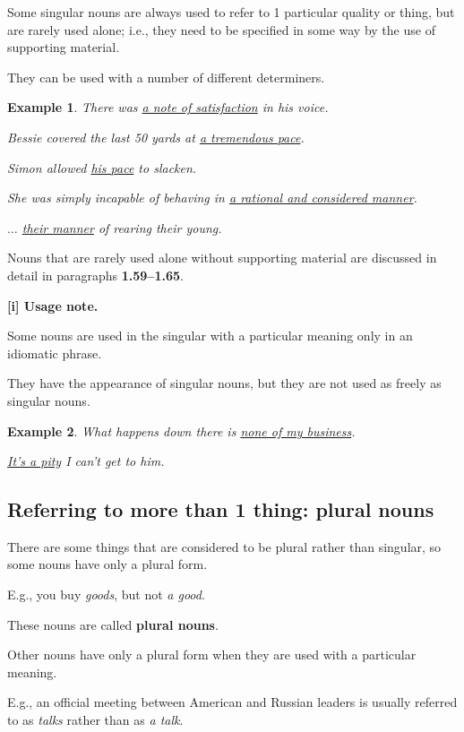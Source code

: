 \documentclass[oneside]{book}
\numberwithin{equation}{section}
\newtheorem{example}{Example}[section]
\begin{document}
%
Some singular nouns are always used to refer to 1 particular quality or thing, but are rarely used alone; i.e., they need to be specified in some way by the use of supporting material.

They can be used with a number of different determiners.
\begin{example}
    There was \underline{a note of satisfaction} in his voice.
    
    Bessie covered the last 50 yards at \underline{a tremendous pace}.
    
    Simon allowed \underline{his pace} to slacken.
    
    She was simply incapable of behaving in \underline{a rational and considered manner}.
    
    $\ldots$ \underline{their manner} of rearing their young.
\end{example}
Nouns that are rarely used alone without supporting material are discussed in detail in paragraphs \textbf{1.59--1.65}.

\textbf{[i] Usage note.}

%
\noindent{} Some nouns are used in the singular with a particular meaning only in an idiomatic phrase.

They have the appearance of singular nouns, but they are not used as freely as singular nouns.
\begin{example}
    What happens down there is \underline{none of my business}.
    
    \underline{It's a pity} I can't get to him.
\end{example}

\subsection{Referring to more than 1 thing: plural nouns}
\noindent{} There are some things that are considered to be plural rather than singular, so some nouns have only a plural form.

E.g., you buy \textit{goods}, but not \textit{a good}.

These nouns are called \textbf{plural nouns}.

%
Other nouns have only a plural form when they are used with a particular meaning.

E.g., an official meeting between American and Russian leaders is usually referred to as \textit{talks} rather than as \textit{a talk}.
\end{document}
